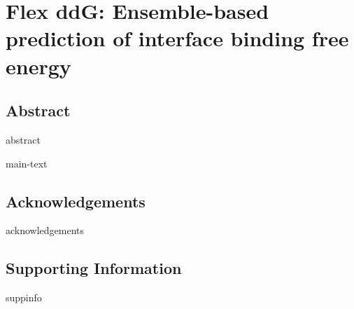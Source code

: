 \chapter{Flex ddG: Ensemble-based prediction of interface binding free energy}
\label{chapter:flex-ddG}

\section{Abstract}
{abstract}

{main-text}

\section{Acknowledgements}
{acknowledgements}

\section{Supporting Information}
{suppinfo}
